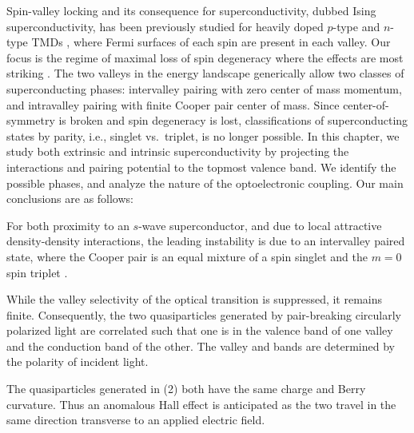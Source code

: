 Spin-valley locking and its consequence for superconductivity,
dubbed Ising superconductivity, has been previously studied
for heavily doped $p$-type and $n$-type TMDs
\cite{%
  Lu1353,%
  Xi2016,%
  Saito2016,%
  PhysRevB.93.180501,%
  PhysRevLett.113.097001%
},
where Fermi surfaces of each spin are present in each valley.
Our focus is the regime of maximal loss of spin degeneracy where the
effects are most striking
\cite{1604.02134v2}.
The two valleys in the energy landscape generically allow
two classes of superconducting phases:
intervalley pairing with zero center of mass momentum,
and intravalley pairing with finite Cooper pair center of mass.
Since center-of-symmetry is broken and spin degeneracy is lost,
classifications of superconducting states by parity,
i.e., singlet vs.\ triplet, is no longer possible.
In this chapter, we study both extrinsic and intrinsic superconductivity
by projecting the interactions and pairing potential to
the topmost valence band.
We identify the possible phases, and analyze the nature
of the optoelectronic coupling.
Our main conclusions are as follows:

\introparanum{}
For both proximity to an $s$-wave superconductor,
and due to local attractive density-density interactions,
the leading instability is due to an intervalley paired state,
where the Cooper pair is an equal mixture
of a spin singlet and the $m = 0$ spin triplet
\cite{PhysRevLett.87.037004}.

\introparanum{}
While the valley selectivity of the optical transition is suppressed,
it remains finite.
Consequently, the two quasiparticles
generated by pair-breaking circularly polarized light
are correlated such that one is in the valence band of one valley
and the conduction band of the other.
The valley and bands are determined by the polarity of incident light.

\introparanum{}
The quasiparticles generated in (2)
both have the same charge and Berry curvature.
Thus an anomalous Hall effect is anticipated
as the two travel in the same direction transverse to an applied electric field.
